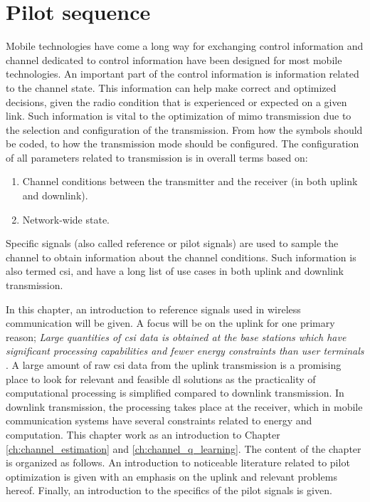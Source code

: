 \chapter{Pilot sequence}\label{ch:pilot_sequence}

Mobile technologies have come a long way for exchanging control information and channel dedicated to control information have been designed for most mobile technologies. An important part of the control information is information related to the channel state. This information can help make correct and optimized decisions, given the radio condition that is experienced or expected on a given link. Such information is vital to the optimization of \gls{mimo} transmission due to the selection and configuration of the transmission. From how the symbols should be coded, to how the transmission mode should be configured. The configuration of all parameters related to transmission is in overall terms based on:

\begin{enumerate}
    \item Channel conditions between the transmitter and the receiver (in both uplink and downlink).
    \item Network-wide state.
\end{enumerate}

Specific signals (also called reference or pilot signals) are used to sample the channel to obtain information about the channel conditions. Such information is also termed \gls{csi}, and have a long list of use cases in both uplink and downlink transmission.

In this chapter, an introduction to reference signals used in wireless communication will be given. A focus will be on the uplink for one primary reason; \emph{Large quantities of \gls{csi} data is obtained at the base stations which have significant processing capabilities and fewer energy constraints than user terminals \cite{Studer2018}}. A large amount of raw \gls{csi} data from the uplink transmission is a promising place to look for relevant and feasible \gls{dl} solutions as the practicality of computational processing is simplified compared to downlink transmission. In downlink transmission, the processing takes place at the receiver, which in mobile communication systems have several constraints related to energy and computation. This chapter work as an introduction to Chapter \ref{ch:channel_estimation} and \ref{ch:channel_q_learning}. The content of the chapter is organized as follows. An introduction to noticeable literature related to pilot optimization is given with an emphasis on the uplink and relevant problems hereof. Finally, an introduction to the specifics of the pilot signals is given.


